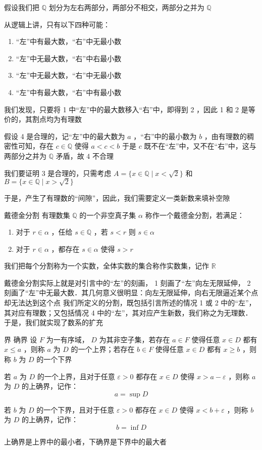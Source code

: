 
假设我们把 $\mathbb{Q}$ 划分为左右两部分，两部分不相交，两部分之并为 $\mathbb{Q}$

从逻辑上讲，只有以下四种可能：

\begin{enumerate}
\item “左”中有最大数，“右”中无最小数
\item “左”中无最大数，“右”中右最小数
\item “左”中无最大数，“右”中无最小数
\item “左”中有最大数，“右”中有最小数
\end{enumerate}
我们发现，只要将 1 中“左”中的最大数移入“右”中，即得到 2 ，因此 1 和 2 是等价的，其割点均为有理数

假设 4 是合理的，记“左”中的最大数为 $a$ ，“右”中的最小数为 $b$ ，由有理数的稠密性可知，存在 $c\in\mathbb{Q}$ 使得 $\displaystyle{a<c<b}$ 于是 $c$ 既不在“左”中，又不在“右”中，这与两部分之并为 $\mathbb{Q}$ 矛盾，故 4 不合理

我们要证明 3 是合理的，只需考虑 $A=\{x\in\mathbb{Q}\mid x<\sqrt{2}\}$ 和 $B=\{x\in\mathbb{Q}\mid x>\sqrt{2}\}$

于是，产生了有理数的“间隙”，因此，我们需要定义一类新数来填补空隙

\begin{definition}{戴德金分割}
有理数集 $\mathbb{Q}$ 的一个非空真子集 $\alpha$  称作一个戴德金分割，若满足：
\begin{enumerate}
\item 对于 $r\in \alpha$ ，任给 $s\in\mathbb{Q}$ ，若 $s<r$ 则 $s\in\alpha$ 
\item 对于 $r\in \alpha$ ，都存在 $s\in\alpha$ 使得 $s>r$ 
\end{enumerate}
我们把每个分割称为一个实数，全体实数的集合称作实数集，记作 $\mathbb{R}$ 
\end{definition}
戴德金分割实际上就是对引言中的“左”的刻画， 1 刻画了“左”向左无限延伸， 2 刻画了“左”中无最大数．其几何意义很明显：向左无限延伸，向右无限逼近某个点却无法达到这个点
我们所定义的分割，既包括引言所述的情况 1 或 2 中的“左”，其对应有理数；又包括情况 4 中的“左”，其对应产生新数，我们称之为无理数．于是，我们就实现了数系的扩充

\begin{definition}{界 确界}
设 $F$ 为一有序域， $D$ 为其非空子集，若存在 $a\in  F$ 使得任意 $x\in D$ 都有 $x\leq a$ ，则称 $a$ 为 $D$ 的一个上界；若存在 $b\in  F$ 使得任意 $x\in D$ 都有 $x\geq b$ ，则称 $b$ 为 $D$ 的一个下界

若 $a$ 为 $D$ 的一个上界，且对于任意 $\varepsilon>0$ 都存在 $x\in D$ 使得 $x>a-\varepsilon$ ，则称 $a$ 为 $D$ 的上确界，记作：
$$a=\sup D$$ 

若 $b$ 为 $D$ 的一个下界，且对于任意 $\varepsilon>0$ 都存在 $x\in D$ 使得 $x<b+\varepsilon$ ，则称 $b$ 为 $D$ 的上确界，记作：
 $$b=\inf D$$ 
\end{definition}
\begin{lemma}{}
上确界是上界中的最小者，下确界是下界中的最大者
\end{lemma}

